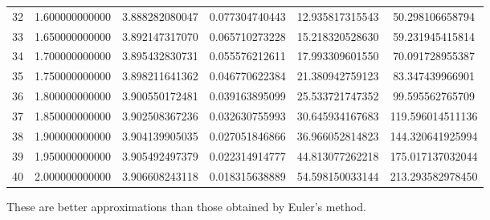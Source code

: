 \documentclass{article}
\begin{document}
\begin{table}
\begin{tabular}{S[table-format=2] S[table-format=1.2] S[table-format=1.9]
S[table-format=1.9] S[table-format=2.8] S[table-format=3.7]}
32 & 1.600000000000 & 3.888282080047 & 0.077304740443 & 12.935817315543 & 50.298106658794 \\
33 & 1.650000000000 & 3.892147317070 & 0.065710273228 & 15.218320528630 & 59.231945415814 \\
34 & 1.700000000000 & 3.895432830731 & 0.055576212611 & 17.993309601550 & 70.091728955387 \\
35 & 1.750000000000 & 3.898211641362 & 0.046770622384 & 21.380942759123 & 83.347439966901 \\
36 & 1.800000000000 & 3.900550172481 & 0.039163895099 & 25.533721747352 & 99.595562765709 \\
37 & 1.850000000000 & 3.902508367236 & 0.032630755993 & 30.645934167683 & 119.596014511136 \\
38 & 1.900000000000 & 3.904139905035 & 0.027051846866 & 36.966052814823 & 144.320641925994 \\
39 & 1.950000000000 & 3.905492497379 & 0.022314914777 & 44.813077262218 & 175.017137032044 \\
40 & 2.000000000000 & 3.906608243118 & 0.018315638889 & 54.598150033144 & 213.293582978450 \\
\bottomrule
\end{tabular}
\end{table}
These are better approximations than those obtained by Euler's method.
\end{document}
